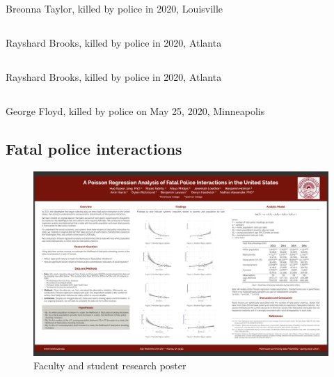 \documentclass[
  letterpaper,
  DIV=11,
  numbers=noendperiod]{scrartcl}
\begin{document}
Breonna Taylor, killed by police in 2020, Louisville

\hypertarget{section-5}{%
\subsection{}\label{section-5}}

Rayshard Brooks, killed by police in 2020, Atlanta

\hypertarget{section-6}{%
\subsection{}\label{section-6}}

Rayshard Brooks, killed by police in 2020, Atlanta

\hypertarget{section-7}{%
\subsection{}\label{section-7}}

George Floyd, killed by police on May 25, 2020, Minneapolis

\hypertarget{fatal-police-interactions}{%
\subsection{Fatal police interactions}\label{fatal-police-interactions}}

\begin{figure}

{\centering \includegraphics{poster3.png}

}

\caption{Faculty and student research poster}

\end{figure}
\end{document}
